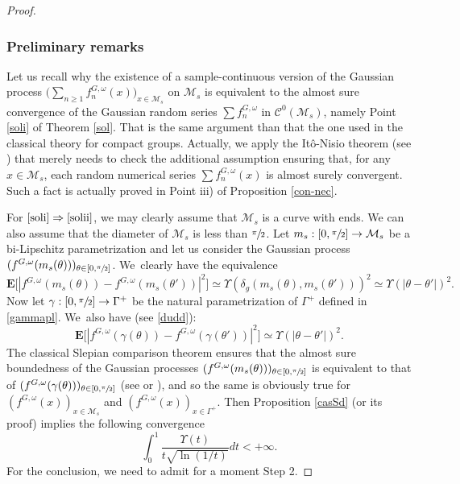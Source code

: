 \documentclass[JEP,XML,SOM,Unicode,NoEqCountersInSection,published]{cedram}
\theoremstyle{theorem}
\theoremstyle{definition}
\newcommand\E{\mathbf{E}}
\newcommand\CC{\mathcal{C}}
\begin{document}
\skpt
\begin{proof}\vspace*{-.5\baselineskip}
\subsubsection*{Preliminary remarks}
Let us recall why the existence of a sample-continuous version of the Gaussian process $\bigl(\sum_{n\geq 1}f_n^{G,\omega}(x)\bigr)_{x\in \mathcal{M}_s}$ on $\mathcal{M}_s$ is equivalent to the almost sure convergence of the Gaussian random series $\sum f_n^{G,\omega}$ in $\CC^0(\mathcal{M}_s)$, namely Point \eqref{soli} of Theorem \ref{sol}. That is the same argument than that the one used in the classical theory for compact groups. Actually, we apply the Itô-Nisio theorem (see \cite[p.\,238]{queff2}) that merely needs to check the additional assumption ensuring that, for any $x\in \mathcal{M}_s$, each random numerical series $\sum f_n^{G,\omega}(x)$ is almost surely convergent. Such a fact is actually proved in Point iii) of Proposition \ref{con-nec}.

 For $\eqref{soli}\Rightarrow\eqref{solii}$, we may clearly assume that $\mathcal{M}_s$ is a curve with ends. We can also assume that the diameter of $\mathcal{M}_s$ is less than $\sfrac{\pi}{2}$. Let $m_s: [0,\sfrac{\pi}{2}]\to \mathcal{M}_s$ be a bi-Lipschitz parametrization and let us consider the Gaussian process $(f^{G,\omega}(m_s(\theta)))_{\theta \in [0,\sfrac{\pi}{2}]}$. We~clearly have the equivalence
\begin{equation*}
\E\bigl[|f^{G,\omega}(m_s(\theta))-f^{G,\omega}(m_s(\theta'))|^2\bigr]\simeq \Upsilon(\delta_g(m_s(\theta),m_s(\theta')))^2\simeq \Upsilon(|\theta-\theta'|)^2.
\end{equation*}
Now let $\gamma:[0,\sfrac{\pi}{2}]\to \Gamma^{+}$ be the natural parametrization of $\Gamma^{+}$ defined in \eqref{gammapl}. We~also have (see \eqref{dudd}):
\begin{equation}\label{defSS}
\E\bigl[|f^{G,\omega}(\gamma(\theta))-f^{G,\omega}(\gamma(\theta'))|^2\bigr]\simeq \Upsilon(|\theta-\theta'|)^2.
\end{equation}
The classical Slepian comparison theorem ensures that the almost sure boundedness of the Gaussian processes $(f^{G,\omega}(m_s(\theta)))_{\theta \in [0,\sfrac{\pi}{2}]}$ is equivalent to that of
$(f^{G,\omega}(\gamma(\theta)))_{\theta\in [0,\sfrac{\pi}{2}]}$ (see \cite[Cor.\,3.14]{ledoux} or \cite[p.\,73]{queff2}), and so the same is obviously true for $(f^{G,\omega}(x))_{x\in \mathcal{M}_s}$ and $(f^{G,\omega}(x))_{x\in \Gamma^+}$. Then Proposition \ref{casSd} (or its proof) implies the following convergence
\begin{equation}\label{uup}
\int_{0}^1 \frac{\Upsilon(t)}{t\sqrt{\ln(1/t)}}dt <+\infty.
\end{equation}
For the conclusion, we need to admit for a moment Step 2.


\end{proof}
\end{document}
